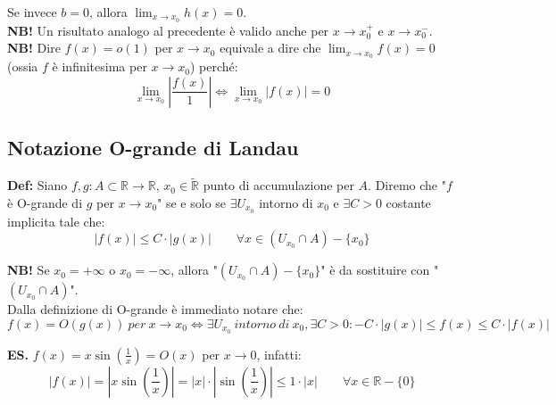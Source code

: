 \documentclass{article}
\begin{document}
\noindent Se invece $b = 0$, allora $\lim_{x \to x_0} h(x) = 0$.\\

\noindent\textbf{NB!} Un risultato analogo al precedente è valido anche per $x \to x_0^+$ e $x \to x_0^-$.\\

\noindent\textbf{NB!} Dire $f(x) = o(1)$ per $x \to x_0$ equivale a dire che $\lim_{x \to x_0} f(x) = 0$ (ossia $f$ è infinitesima per $x \to x_0$) perché:
\begin{equation*}
    \lim_{x \to x_0} \left|\frac{f(x)}{1}\right| \iff \lim_{x \to x_0} |f(x)| = 0
\end{equation*}

\subsection{Notazione O-grande di Landau}
\textbf{Def:} Siano $f, g: A \subset \mathbb{R} \xrightarrow{} \mathbb{R}$, $x_0 \in \widetilde{\mathbb{R}}$ punto di accumulazione per $A$. Diremo che "$f$ è O-grande di $g$ per $x \to x_0$" se e solo se $\exists U_{x_0}$ intorno di $x_0$ e $\exists C > 0$ costante implicita tale che:
\begin{equation*}
    |f(x)| \leq C \cdot |g(x)| \qquad \forall x \in (U_{x_0} \cap A) - \{x_0\}
\end{equation*}

\noindent\textbf{NB!} Se $x_0 = +\infty$ o $x_0 = -\infty$, allora "$(U_{x_0} \cap A) - \{x_0\}$" è da sostituire con "$(U_{x_0} \cap A)$".\\

\noindent Dalla definizione di O-grande è immediato notare che: 
\begin{equation*}
    f(x) = O(g(x)) \ per \ x \to x_0 \iff \exists U_{x_0} \ intorno \ di \ x_0, \exists C > 0 : -C \cdot |g(x)| \leq f(x) \leq C \cdot |f(x)|
\end{equation*}

\noindent\textbf{ES.} $f(x) = x\sin(\frac{1}{x}) = O(x)$ per $x \to 0$, infatti:
\begin{equation*}
    |f(x)| = \left|x\sin\left(\frac{1}{x}\right)\right| = |x| \cdot \left|\sin\left(\frac{1}{x}\right)\right| \leq 1 \cdot |x| \qquad \forall x \in \mathbb{R} - \{0\}
\end{equation*}
\end{document}
